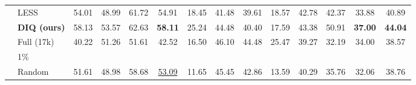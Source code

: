 \documentclass[letterpaper]{article} %
\newcommand{\tableLineColorGray}{\rowcolor{verylightgray}}
\newcommand{\TableLineColor}{\rowcolor{lightblue}}
\begin{document}
\begin{table}[!t]
\begin{adjustbox}{max width=1.0\textwidth}
\begin{tabular}{llcccccccccccc}
                                                    & LESS                                               & 54.01                             & 48.99                             & 61.72                             & 54.91                                & 18.45                            & 41.48                             & 39.61                             & 18.57                             & 42.78                             & 42.37                             & 33.88                                & 40.89                                \\
\TableLineColor \cellcolor{white}\multirow{-13}{*}{Huatuo~\cite{huatuogpto1}} &  \textbf{DIQ (ours)}                                & 58.13                             & 53.57                             & 62.63                             & \textbf{58.11}                       & 25.24                            & 44.48                             & 40.40                             & 17.59                             & 43.38                             & 50.91                             & \textbf{37.00}                       & \textbf{44.04}                       \\ \midrule
\tableLineColorGray \cellcolor{white}               &  Full (17k)                                         & 40.22                             & 51.26                             & 51.61                             & 42.52                                & 16.50                            & 46.10                             & 44.48                             & 25.47                             & 39.27                             & 32.19                             & 34.00                                & 38.57                                \\ \cmidrule(l){2-14}
                                                    & 1\%                                                &                                   &                                   &                                   &                                      &                                  &                                   &                                   &                                   &                                   &                                   &                                      &                                      \\
                                                    & Random                                             & 51.61                             & 48.98                             & 58.68                             & \underline{53.09}                                & 11.65                            & 45.45                             & 42.86                             & 13.59                             & 40.29                             & 35.76                             & 32.06                                & 38.76                                \\

\end{tabular}
\end{adjustbox}
\end{table}
\end{document}
